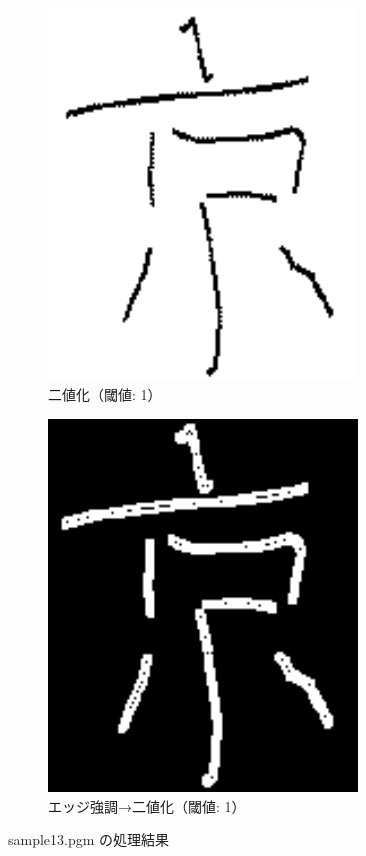 \documentclass[a4paper,12pt]{jsarticle}
\begin{document}
\begin{figure}[!htbp]
\begin{subfigure}[b]{0.45\textwidth}
    \centering
    \includegraphics[width=0.9\textwidth]{./images/binarized_sample13_binary.png}
    \caption{二値化（閾値: 1）}
\end{subfigure}
\hfill
\begin{subfigure}[b]{0.45\textwidth}
    \centering
    \includegraphics[width=0.9\textwidth]{./images/combined_sample13_combined.png}
    \caption{エッジ強調→二値化（閾値: 1）}
\end{subfigure}
\caption{sample13.pgm の処理結果}
\label{fig:sample13}
\end{figure}
\end{document}
